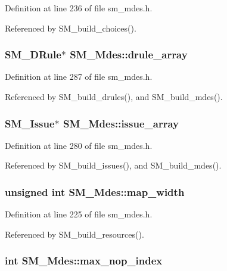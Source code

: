 Definition at line 236 of file sm\_\-mdes.h.

Referenced by SM\_\-build\_\-choices().
\subsubsection{\setlength{\rightskip}{0pt plus 5cm}\bf{SM\_\-DRule}$\ast$ \bf{SM\_\-Mdes::drule\_\-array}}\label{structSM__Mdes_be2797e87ecc6e24efb2e416a30e721b}




Definition at line 287 of file sm\_\-mdes.h.

Referenced by SM\_\-build\_\-drules(), and SM\_\-build\_\-mdes().
\subsubsection{\setlength{\rightskip}{0pt plus 5cm}\bf{SM\_\-Issue}$\ast$ \bf{SM\_\-Mdes::issue\_\-array}}\label{structSM__Mdes_99249ce21439b133afaa8645279974d0}




Definition at line 280 of file sm\_\-mdes.h.

Referenced by SM\_\-build\_\-issues(), and SM\_\-build\_\-mdes().
\subsubsection{\setlength{\rightskip}{0pt plus 5cm}unsigned int \bf{SM\_\-Mdes::map\_\-width}}\label{structSM__Mdes_f23116b6bcaa9e2d7da7e89ac3db382a}




Definition at line 225 of file sm\_\-mdes.h.

Referenced by SM\_\-build\_\-resources().
\subsubsection{\setlength{\rightskip}{0pt plus 5cm}int \bf{SM\_\-Mdes::max\_\-nop\_\-index}}\label{structSM__Mdes_0f747c0ec8d233dedd6f336c3e03d875}




